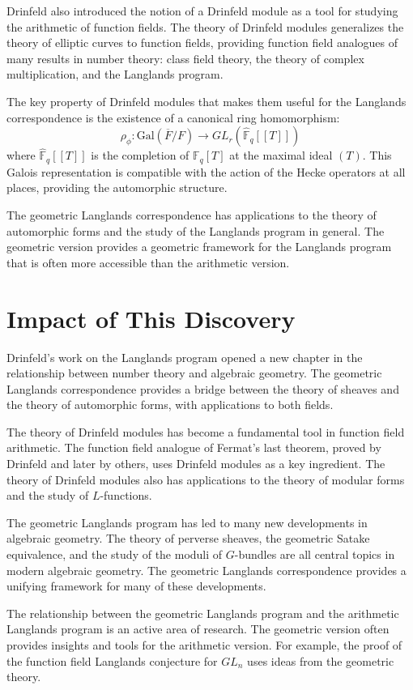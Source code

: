 Drinfeld also introduced the notion of a Drinfeld module as a tool for studying the arithmetic of function fields. The theory of Drinfeld modules generalizes the theory of elliptic curves to function fields, providing function field analogues of many results in number theory: class field theory, the theory of complex multiplication, and the Langlands program.

The key property of Drinfeld modules that makes them useful for the Langlands correspondence is the existence of a canonical ring homomorphism:
\[
\rho_\phi: \text{Gal}(\overline{F}/F) \to GL_r(\hat{\mathbb{F}}_q[[T]])
\]
where $\hat{\mathbb{F}}_q[[T]]$ is the completion of $\mathbb{F}_q[T]$ at the maximal ideal $(T)$. This Galois representation is compatible with the action of the Hecke operators at all places, providing the automorphic structure.

The geometric Langlands correspondence has applications to the theory of automorphic forms and the study of the Langlands program in general. The geometric version provides a geometric framework for the Langlands program that is often more accessible than the arithmetic version.

\section{Impact of This Discovery}

Drinfeld's work on the Langlands program opened a new chapter in the relationship between number theory and algebraic geometry. The geometric Langlands correspondence provides a bridge between the theory of sheaves and the theory of automorphic forms, with applications to both fields.

The theory of Drinfeld modules has become a fundamental tool in function field arithmetic. The function field analogue of Fermat's last theorem, proved by Drinfeld and later by others, uses Drinfeld modules as a key ingredient. The theory of Drinfeld modules also has applications to the theory of modular forms and the study of $L$-functions.

The geometric Langlands program has led to many new developments in algebraic geometry. The theory of perverse sheaves, the geometric Satake equivalence, and the study of the moduli of $G$-bundles are all central topics in modern algebraic geometry. The geometric Langlands correspondence provides a unifying framework for many of these developments.

The relationship between the geometric Langlands program and the arithmetic Langlands program is an active area of research. The geometric version often provides insights and tools for the arithmetic version. For example, the proof of the function field Langlands conjecture for $GL_n$ uses ideas from the geometric theory.

